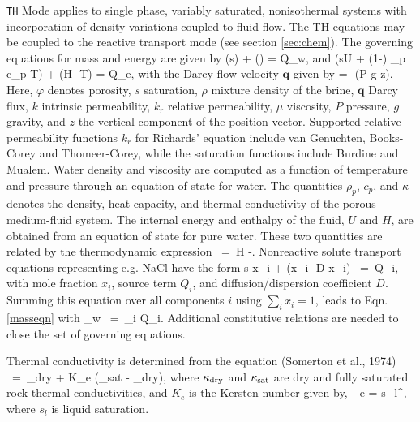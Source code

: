 \documentclass[12pt]{article}
\def\EQ#1\EN{\begin{equation}#1\end{equation}}
\newcommand{\eq}{\ =\ }
\newcommand{\p}{{\partial}}
\newcommand{\bnabla}{\boldsymbol{\nabla}}
\newcommand{\bq}{\boldsymbol{q}}
\begin{document}
{\tt TH} Mode applies to single phase, variably saturated, nonisothermal systems
with incorporation of density variations coupled to fluid flow. The TH equations may be coupled to the reactive transport mode (see section \ref{sec:chem}).
The governing equations for mass and energy are given by
\EQ\label{masseqn}
\frac{\p}{\p t}\left(\varphi s\rho\right) + \bnabla\cdot\left(\rho\bq\right) = Q_w,
\EN
and
\EQ
\frac{\p}{\p t}\left(\varphi s\rho U + (1-\varphi) \rho_p c_p T\right) + \bnabla\cdot\left(\rho\bq H -\kappa \bnabla T\right) = Q_e,
\EN
with the Darcy flow velocity $\bq$ given by
\EQ
\bq = -\bnabla\left(P-\rho g z\right).
\EN
Here, $\varphi$ denotes porosity, $s$ saturation, $\rho$ mixture density of the brine, $\bq$ Darcy flux, $k$ intrinsic permeability, $k_r$ relative permeability, $\mu$ viscosity, $P$ pressure, $g$ gravity, and $z$ the vertical component of the position vector.  Supported relative permeability functions $k_r$ for Richards' equation include van Genuchten, Books-Corey and Thomeer-Corey, while the saturation functions include Burdine and Mualem.  Water density and viscosity are computed as a function of temperature and pressure through an equation of state for water. The quantities $\rho_p$, $c_p$, and $\kappa$ denotes the density, heat capacity, and thermal conductivity of the porous medium-fluid system. The internal energy and enthalpy of the fluid, $U$ and $H$, are obtained from an equation of state for pure water. These two quantities are related by the thermodynamic expression
\EQ
U \eq H -.
\EN
Nonreactive solute transport equations representing e.g. NaCl have the form
\EQ
\frac{\p}{\p t} \varphi s \rho x_i + \bnabla\cdot\Big(\bq \rho x_i -\varphi D \rho\bnabla x_i\Big) \eq Q_i,
\EN
with mole fraction $x_i$, source term $Q_i$, and diffusion/dispersion coefficient $D$. Summing this equation over all components $i$ using $\sum_ix_i=1$, leads to Eqn.\eqref{masseqn} with
\EQ
Q_w \eq \sum_i Q_i.
\EN
Additional constitutive relations are needed to close the set of governing equations.
 
 
Thermal conductivity is determined from the equation (Somerton et al., 1974)  
\EQ\label{cond1} 
\kappa \eq \kappa_{\rm dry} + K_e (\kappa_{\rm sat} - \kappa_{\rm dry}), 
\EN 
where $\kappa_{\rm dry}$ and $\kappa_{\rm sat}$ are dry and fully saturated rock thermal conductivities,
and $K_e$ is the Kersten number given by,
\EQ
K_e = s_l^{\alpha},
\EN
where $s_l$ is liquid saturation.
\end{document}
